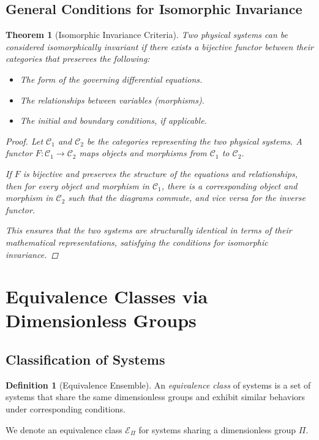 \documentclass{article}
\newtheorem{theorem}{Theorem}[section]
\theoremstyle{definition}
\newtheorem{definition}{Definition}[section]
\theoremstyle{remark}
\begin{document}
	\subsection{General Conditions for Isomorphic Invariance}
	
	\begin{theorem}[Isomorphic Invariance Criteria]
		Two physical systems can be considered isomorphically invariant if there exists a bijective functor between their categories that preserves the following:
		
		\begin{itemize}
			\item The form of the governing differential equations.
			\item The relationships between variables (morphisms).
			\item The initial and boundary conditions, if applicable.
		\end{itemize}
		
		\begin{proof}
			Let $\mathcal{C}_1$ and $\mathcal{C}_2$ be the categories representing the two physical systems. A functor $F: \mathcal{C}_1 \rightarrow \mathcal{C}_2$ maps objects and morphisms from $\mathcal{C}_1$ to $\mathcal{C}_2$.
			
			If $F$ is bijective and preserves the structure of the equations and relationships, then for every object and morphism in $\mathcal{C}_1$, there is a corresponding object and morphism in $\mathcal{C}_2$ such that the diagrams commute, and vice versa for the inverse functor.
			
			This ensures that the two systems are structurally identical in terms of their mathematical representations, satisfying the conditions for isomorphic invariance.
			
		\end{proof}
	\end{theorem}
	
	\section{Equivalence Classes via Dimensionless Groups}
	
	\subsection{Classification of Systems}
	
	\begin{definition}[Equivalence Ensemble]
		An \emph{equivalence class} of systems is a set of systems that share the same dimensionless groups and exhibit similar behaviors under corresponding conditions.
		
		We denote an equivalence class $\mathcal{E}_\Pi$ for systems sharing a dimensionless group $\Pi$.
	\end{definition}
	
\end{document}
